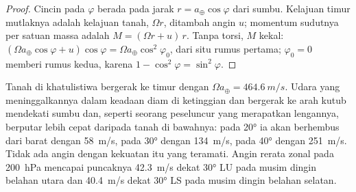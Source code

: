 \begin{proof}
Cincin pada  $\varphi$ berada pada jarak $r = a_\oplus\cos\varphi$ dari
sumbu. Kelajuan timur mutlaknya adalah kelajuan tanah, $\Omega r$, ditambah angin
$u$; momentum sudutnya per satuan massa adalah $M = (\Omega r + u)\,r$. Tanpa torsi,
$M$ kekal: $(\Omega a_\oplus\cos\varphi + u)\cos\varphi = \Omega a_\oplus
\cos^2\varphi_0$, dari situ rumus pertama; $\varphi_0 = 0$ memberi rumus kedua, karena
$1 - \cos^2\varphi = \sin^2\varphi$.
\end{proof}

Tanah di khatulistiwa bergerak ke timur dengan $\Omega a_\oplus = \qty{464.6}{m/s}$. Udara yang meninggalkannya dalam keadaan diam di ketinggian dan bergerak ke arah kutub mendekati sumbu dan, seperti seorang peseluncur yang merapatkan lengannya, berputar lebih cepat daripada tanah di bawahnya: pada \ang{20} ia akan berhembus dari barat dengan \qty{58}{m/s}, pada \ang{30} dengan \qty{134}{m/s}, pada \ang{40} dengan \qty{251}{m/s}. Tidak ada angin dengan kekuatan itu yang teramati. Angin rerata zonal pada \qty{200}{hPa} mencapai puncaknya \qty{42.3}{m/s} dekat \ang{30} LU pada musim dingin belahan utara dan \qty{40.4}{m/s} dekat \ang{30} LS pada musim dingin belahan selatan.

